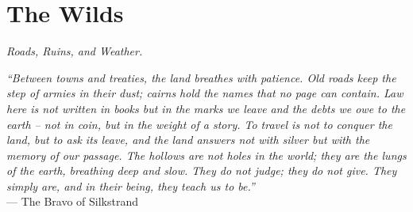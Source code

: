\documentclass[12pt,oneside]{book}
\begin{document}


\newpage

\chapter{The Wilds}
\emph{Roads, Ruins, and Weather.}

\noindent
\textit{``Between towns and treaties, the land breathes with patience. Old roads keep the step of armies in their dust; cairns hold the names that no page can contain. Law here is not written in books but in the marks we leave and the debts we owe to the earth -- not in coin, but in the weight of a story. To travel is not to conquer the land, but to ask its leave, and the land answers not with silver but with the memory of our passage. The hollows are not holes in the world; they are the lungs of the earth, breathing deep and slow. They do not judge; they do not give. They simply are, and in their being, they teach us to be.''} \\
--- The Bravo of Silkstrand
\end{document}
